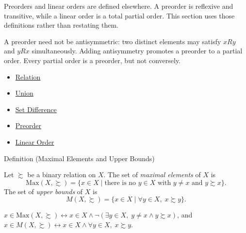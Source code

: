 \begin{remark*}[Exposition]
Preorders and linear orders are defined elsewhere. A preorder is reflexive and
transitive, while a linear order is a total partial order. This section uses
those definitions rather than restating them.
\end{remark*}

\begin{remark*}[Exposition]
A preorder need not be antisymmetric: two distinct elements may satisfy $xRy$
and $yRx$ simultaneously. Adding antisymmetry promotes a preorder to a partial
order. Every partial order is a preorder, but not conversely.
\end{remark*}

\begin{dependencies}
\begin{itemize}
  \item \hyperref[def:relation]{Relation}
  \item \hyperref[def:union]{Union}
  \item \hyperref[def:set-difference]{Set Difference}
  \item \hyperref[def:preorder]{Preorder}
  \item \hyperref[def:total-order]{Linear Order}
\end{itemize}
\end{dependencies}


\begin{definitionbox}{Definition (Maximal Elements and Upper Bounds)}
\begin{definition}\label{def:maximal-upper}
Let $\succsim$ be a binary relation on $X$. The set of \emph{maximal elements}
of $X$ is
\[
  \mathrm{Max}(X,\succsim)
  = \{x\in X\mid \text{there is no } y\in X \text{ with } y\neq x
      \text{ and } y\succsim x\}.
\]
The set of \emph{upper bounds} of $X$ is
\[
  M(X,\succsim)
  = \{x\in X\mid \forall y\in X,\; x\succsim y\}.
\]
\end{definition}
\end{definitionbox}

\begin{remark*}
$x\in\mathrm{Max}(X,\succsim)\leftrightarrow
x\in X\wedge\neg(\exists y\in X,\; y\neq x\wedge y\succsim x)$, and
$x\in M(X,\succsim)\leftrightarrow x\in X\wedge\forall y\in X,\; x\succsim y$.
\end{remark*}

